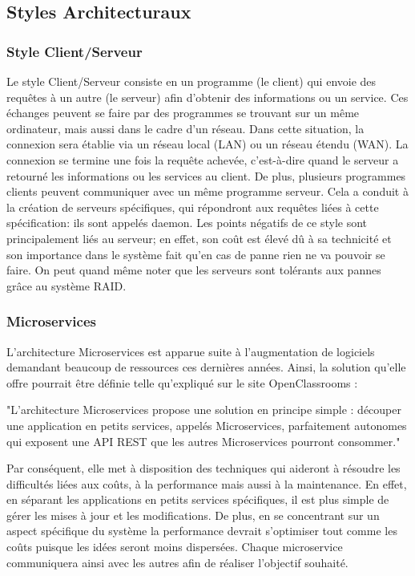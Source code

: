 \documentclass[12pt]{article}
\begin{document}
\subsection{Styles Architecturaux}

\subsubsection{Style Client/Serveur}

Le style Client/Serveur\cite{client_serveur} consiste en un programme (le client) qui envoie des requêtes à un autre (le serveur) afin d'obtenir des informations ou un service. Ces échanges peuvent se faire par des programmes se trouvant sur un même ordinateur, mais aussi dans le cadre d'un réseau. Dans cette situation, la connexion sera établie via un réseau local (LAN) ou un réseau étendu (WAN). La connexion se termine une fois la requête achevée, c'est-à-dire quand le serveur a retourné les informations ou les services au client. De plus, plusieurs programmes clients peuvent communiquer avec un même programme serveur. Cela a conduit à la création de serveurs spécifiques, qui répondront aux requêtes liées à cette spécification: ils sont appelés daemon. Les points négatifs de ce style sont principalement liés au serveur; en effet, son coût est élevé dû à sa technicité et son importance dans le système fait qu'en cas de panne rien ne va pouvoir se faire. On peut quand même noter que les serveurs sont tolérants aux pannes grâce au système RAID.

\subsubsection{Microservices}

L'architecture Microservices est apparue suite à l'augmentation de logiciels demandant beaucoup de ressources ces dernières années. Ainsi, la solution qu'elle offre pourrait être définie telle qu'expliqué sur le site OpenClassrooms\cite{microservices} : 
\begin{center}
"L'architecture Microservices propose une solution en principe simple : découper une application en petits services, appelés Microservices, parfaitement autonomes qui exposent une API REST que les autres Microservices pourront consommer."
\end{center}
Par conséquent, elle met à disposition des techniques qui aideront à résoudre les difficultés liées aux coûts, à la performance mais aussi à la maintenance. En effet, en séparant les applications en petits services spécifiques, il est plus simple de gérer les mises à jour et les modifications. De plus, en se concentrant sur un aspect spécifique du système la performance devrait s'optimiser tout comme les coûts puisque les idées seront moins dispersées. Chaque microservice communiquera ainsi avec les autres afin de réaliser l'objectif souhaité.
\end{document}
